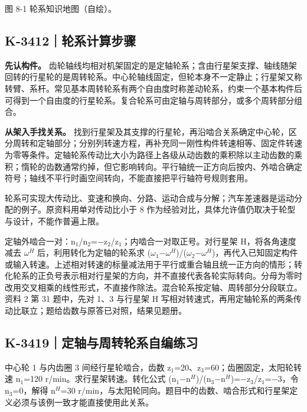 \documentclass[zihao=5,a4paper,UTF8,fontset=fandol]{ctexart}
\begin{document}
图 8-1 轮系知识地图（自绘）。





\subsection{K-3412｜轮系计算步骤}
\label{k-3412}

\textbf{先认构件。} 齿轮轴线均相对机架固定的是定轴轮系；含由行星架支撑、轴线随架回转的行星轮的是周转轮系。中心轮轴线固定，但轮本身不一定静止；行星架又称转臂、系杆。常见基本周转轮系有两个自由度时称差动轮系，约束一个基本构件后可得到一个自由度的行星轮系。复合轮系可由定轴与周转部分，或多个周转部分组合。


\textbf{从架入手找关系。} 找到行星架及其支撑的行星轮，再沿啮合关系确定中心轮，区分周转和定轴部分；分别列转速方程，再补充同一刚性构件转速相等、固定件转速为零等条件。定轴轮系传动比大小为路径上各级从动齿数的乘积除以主动齿数的乘积；惰轮的齿数通常约掉，但它影响转向。平行轴统一正方向后按内、外啮合确定符号；轴线不平行时画空间转向，不能直接把平行轴符号规则套用。


轮系可实现大传动比、变速和换向、分路、运动合成与分解；汽车差速器是运动分配的例子。原资料用单对传动比小于 8 作为经验对比，具体允许值仍取决于轮型与设计，不能作普遍上限。


定轴外啮合一对：n$_{1}$/n$_{2}$=$-$z$_{2}$/z$_{1}$；内啮合一对取正号。对行星架 H，将各角速度减去 $\omega$$^{H}$ 后，利用转化为定轴的轮系求 ($\omega$$_{1}$$-$$\omega$$^{H}$)/($\omega$$_{2}$$-$$\omega$$^{H}$)，再代入已知固定构件或输入转速。上述相对转速的标量减法用于平行或重合轴且统一正方向的情形；转化轮系的正负号表示相对行星架的方向，并不直接代表各轮实际转向。分母为零时改用交叉相乘的线性形式，不直接作除法。混合轮系按定轴、周转部分分段联立。资料 2 第 31 题中，先对 1、3 与行星架 H 写相对转速式，再用定轴轮系的两条传动比联立；题给齿数与原答已对照，结果见题册。





\subsection{K-3419｜定轴与周转轮系自编练习}
\label{k-3419}

中心轮 1 与内齿圈 3 间经行星轮啮合，齿数 z$_{1}$=20、z$_{3}$=60；齿圈固定，太阳轮转速 n$_{1}$=120 r/min。求行星架转速。转化公式 (n$_{1}$$-$n$^{H}$)/(n$_{3}$$-$n$^{H}$)=$-$z$_{3}$/z$_{1}$=$-$3，令 n$_{3}$=0，解得 n$^{H}$=30 r/min，与太阳轮同向。题目中的齿数、啮合形式和行星架定义必须与该例一致才能直接使用此关系。
\end{document}
